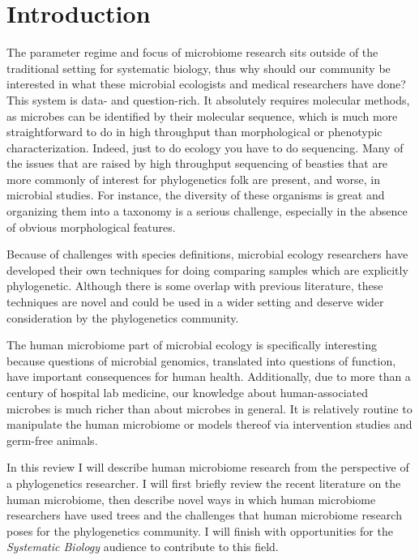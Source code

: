 \documentclass{amsart}
\begin{document}
\section{Introduction}

The parameter regime and focus of microbiome research sits outside of the traditional setting for systematic biology, thus why should our community be interested in what these microbial ecologists and medical researchers have done?
This system is data- and question-rich.
It absolutely requires molecular methods, as microbes can be identified by their molecular sequence, which is much more straightforward to do in high throughput than morphological or phenotypic characterization.
Indeed, just to do ecology you have to do sequencing.
Many of the issues that are raised by high throughput sequencing of beasties that are more commonly of interest for phylogenetics folk are present, and worse, in microbial studies.
For instance, the diversity of these organisms is great and organizing them into a taxonomy is a serious challenge, especially in the absence of obvious morphological features.

Because of challenges with species definitions, microbial ecology researchers have developed their own techniques for doing comparing samples which are explicitly phylogenetic.
Although there is some overlap with previous literature, these techniques are novel and could be used in a wider setting and deserve wider consideration by the phylogenetics community.

The human microbiome part of microbial ecology is specifically interesting because questions of microbial genomics, translated into questions of function, have important consequences for human health.
Additionally, due to more than a century of hospital lab medicine, our knowledge about human-associated microbes is much richer than about microbes in general.
It is relatively routine to manipulate the human microbiome or models thereof via intervention studies and germ-free animals.

In this review I will describe human microbiome research from the perspective of a phylogenetics researcher.
I will first briefly review the recent literature on the human microbiome, then describe novel ways in which human microbiome researchers have used trees and the challenges that human microbiome research poses for the phylogenetics community.
I will finish with opportunities for the \textit{Systematic Biology} audience to contribute to this field.
\end{document}
